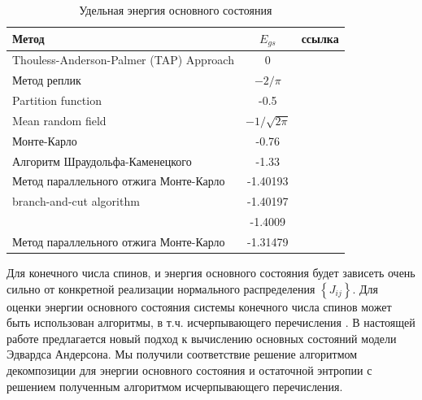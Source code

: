 \documentclass[utf8, babel, sor, jor, amsmath, amssymb, reprint]{elsarticle} %
\begin{document}
\begin{table}[!h]
	\begin{tabular}{|l|c|l|}
		\hline
		Метод                                   & $E_{gs}$                                       & ссылка                                          \\ \hline
		Thouless-Anderson-Palmer (TAP) Approach & 0                                              & \cite{thouless1977solution}    \\ \hline
		Метод реплик                            & $-2/\pi$                                       & \cite{sherrington1975solvable} \\ \hline
		Partition function                      & -0.5                                           & \cite{tanaka1980analytic}      \\ \hline
		Mean random field                       & $-1/\sqrt{2\pi}$                               & \cite{klein1976comparison}     \\ \hline
		Монте-Карло                             & -0.76                                          & \cite{kirkpatrick1978infinite} \\ \hline
		Алгоритм Шраудольфа-Каменецкого         & -1.33                                          & \cite{karandashev2019global}   \\ \hline
		Метод параллельного отжига Монте-Карло  & -1.40193                                       & \cite{palmer1999ground}        \\ \hline
		  branch-and-cut algorithm              & -1.40197                         
		                                        & \cite{campbell2004energy}      \\ \hline
		                                        & -1.4009                                        & \cite{roma2009ground}          \\ \hline
		Метод параллельного отжига Монте-Карло  & -1.31479                                       & \cite{roma2009ground}          \\ \hline
	\end{tabular}
	\label{tab:Egs}
	\caption{Удельная энергия основного состояния}
\end{table}

Для конечного числа спинов, и энергия основного состояния будет зависеть очень сильно от конкретной реализации нормального распределения $\left\lbrace J_{ij} \right\rbrace $. Для оценки энергии основного состояния системы конечного числа спинов может быть использован алгоритмы, в т.ч. исчерпывающего перечисления \cite{padalko2021parallel}. В настоящей работе предлагается новый подход к вычислению основных состояний модели Эдвардса Андерсона. Мы получили соответствие решение алгоритмом декомпозиции для энергии основного состояния и остаточной энтропии с решением полученным алгоритмом исчерпывающего перечисления.  
\end{document}
